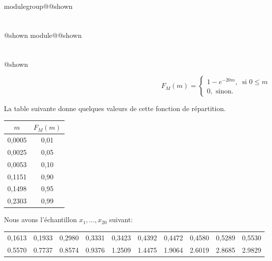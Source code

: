 \documentclass{Evaluation}
\makeatletter
\newcommand{\currentmodulekey}{}
\newcommand{\currentmoduletitle}{}
\newcommand{\currentgroupkey}{}
\newcommand{\currentgrouptitle}{}
\newcommand{\showmoduleifneeded}{%
  \ifx\currentgroupkey\empty\else
    \expandafter\ifx\csname modulegroup@\currentgroupkey @shown\endcsname\relax
      \section*{\currentgrouptitle}%
      \expandafter\gdef\csname modulegroup@\currentgroupkey @shown\endcsname{1}%
    \fi
  \fi
  \expandafter\ifx\csname module@\currentmodulekey @shown\endcsname\relax
    \section*{\currentmoduletitle}%
    \expandafter\gdef\csname module@\currentmodulekey @shown\endcsname{1}%
  \fi
}
\newenvironment{H23}{\showmoduleifneeded}{}
\makeatother
\begin{document}
\begin{questions}
\begin{H23}
 \begin{equation*}
  F_M(m) = \begin{cases}
         1-e^{-20m},\ \text{  si  } 0\leq m \\
        0, \text{ sinon.}
        \end{cases}
 \end{equation*}

La table suivante donne quelques valeurs de cette fonction de répartition.
\begin{table}[ht]
    \centering
\begin{tabular}{|cc|}
  \hline
 $m$ & $F_M(m)$ \\ 
  \hline
    0,0005 & 0,01 \\
    0,0025 & 0,05 \\
    0,0053 & 0,10 \\
    0,1151 & 0,90 \\
    0,1498 & 0,95 \\ 
    0,2303 & 0,99 \\ 
  \hline
\end{tabular}
\end{table}

Nous avons l'échantillon $x_1,\hdots,x_{20}$ suivant:

\begin{table}[ht]
\centering
\begin{tabular}{rrrrrrrrrr}
  \hline
0,1613 & 0,1933 & 0,2980 & 0,3331 & 0,3423 & 0,4392 & 0,4472 & 0,4580 & 0,5289 & 0,5530 \\ 
0.5570 & 0.7737 & 0.8574 & 0.9376 & 1.2509 & 1.4475 & 1.9064 & 2.6019 & 2.8685 & 2.9829 \\ 
   \hline
\end{tabular}
\end{table}


\end{H23}
\end{questions}
\end{document}
